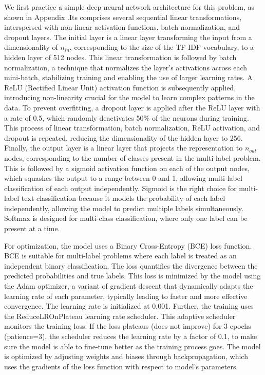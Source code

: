 \documentclass{article}
\begin{document}
We first practice a simple deep neural network architecture for this problem, as shown in Appendix .Its comprises several sequential linear transformations, interspersed with non-linear activation functions, batch normalization, and dropout layers. The initial layer is a linear layer transforming the input from a dimensionality of $n_{in}$, corresponding to the size of the TF-IDF vocabulary, to a hidden layer of 512 nodes. This linear transformation is followed by batch normalization, a technique that normalizes the layer's activations across each mini-batch, stabilizing training and enabling the use of larger learning rates. A ReLU (Rectified Linear Unit) activation function is subsequently applied, introducing non-linearity crucial for the model to learn complex patterns in the data. To prevent overfitting, a dropout layer is applied after the ReLU layer with a rate of 0.5, which randomly deactivates 50\% of the neurons during training. This process of linear transformation, batch normalization, ReLU activation, and dropout is repeated, reducing the dimensionality of the hidden layer to 256. Finally, the output layer is a linear layer that projects the representation to $n_{out}$ nodes, corresponding to the number of classes present in the multi-label problem. This is followed by a sigmoid activation function on each of the output nodes, which squashes the output to a range between 0 and 1, allowing multi-label classification of each output independently. Sigmoid is the right choice for multi-label text classification because it models the probability of each label independently, allowing the model to predict multiple labels simultaneously. Softmax is designed for multi-class classification, where only one label can be present at a time.


For optimization, the model uses a Binary Cross-Entropy (BCE) loss function. BCE is suitable for multi-label problems where each label is treated as an independent binary classification. The loss quantifies the divergence between the predicted probabilities and true labels. This loss is minimized by the model using the Adam optimizer, a variant of gradient descent that dynamically adapts the learning rate of each parameter, typically leading to faster and more effective convergence. The learning rate is initialized at 0.001. Further, the training uses the ReduceLROnPlateau learning rate scheduler. This adaptive scheduler monitors the training loss. If the loss plateaus (does not improve) for 3 epochs (patience=3), the scheduler reduces the learning rate by a factor of 0.1, to make sure the model is able to fine-tune better as the training process goes. The model is optimized by adjusting weights and biases through backpropagation, which uses the gradients of the loss function with respect to model's parameters. 
\end{document}
